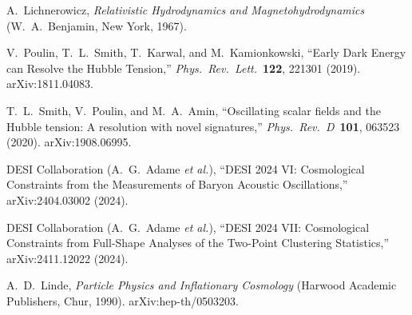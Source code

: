 A.~Lichnerowicz, \emph{Relativistic Hydrodynamics and Magnetohydrodynamics} (W.~A.~Benjamin, New York, 1967).


V.~Poulin, T.~L.~Smith, T.~Karwal, and M.~Kamionkowski, ``Early Dark Energy can Resolve the Hubble Tension,'' \emph{Phys.\ Rev.\ Lett.}\ \textbf{122}, 221301 (2019). arXiv:1811.04083.

T.~L.~Smith, V.~Poulin, and M.~A.~Amin, ``Oscillating scalar fields and the Hubble tension: A resolution with novel signatures,'' \emph{Phys.\ Rev.\ D}\ \textbf{101}, 063523 (2020). arXiv:1908.06995.

DESI Collaboration (A.~G.~Adame \emph{et al.}), ``DESI 2024 VI: Cosmological Constraints from the Measurements of Baryon Acoustic Oscillations,'' arXiv:2404.03002 (2024).

DESI Collaboration (A.~G.~Adame \emph{et al.}), ``DESI 2024 VII: Cosmological Constraints from Full-Shape Analyses of the Two-Point Clustering Statistics,'' arXiv:2411.12022 (2024).


A.~D.~Linde, \emph{Particle Physics and Inflationary Cosmology} (Harwood Academic Publishers, Chur, 1990). arXiv:hep-th/0503203.

